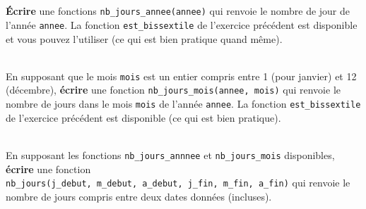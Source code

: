 \documentclass[a4paper,17pt]{extarticle}
\newenvironment{eleve}%
{\begin{activite}\color{noiramu}\\[-0.5cm]}
{\end{activite}}
\begin{document}
\begin{eleve}
        \end{eleve}\begin{eleve}
    \textbf{Écrire} une fonctions \texttt{nb\_jours\_annee(annee)} qui
renvoie le nombre de jour de l'année \texttt{annee}. La fonction
\texttt{est\_bissextile} de l'exercice précédent est disponible et vous
pouvez l'utiliser (ce qui est bien pratique quand même).
        
        \end{eleve}\begin{eleve}
    En supposant que le mois \texttt{mois} est un entier compris entre 1
(pour janvier) et 12 (décembre), \textbf{écrire} une fonction
\texttt{nb\_jours\_mois(annee,\ mois)} qui renvoie le nombre de jours
dans le mois \texttt{mois} de l'année \texttt{annee}. La fonction
\texttt{est\_bissextile} de l'exercice précédent est disponible (ce qui
est bien pratique).
        
        \end{eleve}\begin{eleve}
    En supposant les fonctions \texttt{nb\_jours\_annnee} et
\texttt{nb\_jours\_mois} disponibles, \textbf{écrire} une fonction
\texttt{nb\_jours(j\_debut,\ m\_debut,\ a\_debut,\ j\_fin,\ m\_fin,\ a\_fin)}
qui renvoie le nombre de jours compris entre deux dates données
(incluses).
        
        \end{eleve}

    
    
    
\end{document}
